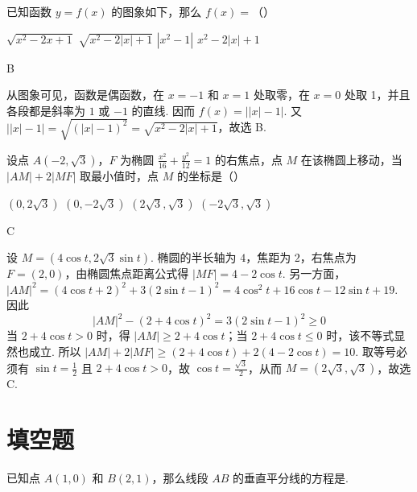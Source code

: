 \begin{problem}
已知函数 \(y = f(x)\) 的图象如下，那么 \(f(x) =\)（\quad）


\choices
    {\(\sqrt{x^2 - 2x + 1}\)}
    {\(\sqrt{x^2 - 2|x| + 1}\)}
    {\(|x^2 - 1|\)}
    {\(x^2 - 2|x| + 1\)}
\end{problem}

\begin{answer}
B
\end{answer}

\begin{solution}
从图象可见，函数是偶函数，在 \(x=-1\) 和 \(x=1\) 处取零，在 \(x=0\) 处取 1，并且各段都是斜率为 \(1\) 或 \(-1\) 的直线. 因而 \(f(x)=\bigl||x|-1\bigr|\). 又 \(\bigl||x|-1\bigr|=\sqrt{(|x|-1)^2}=\sqrt{x^2-2|x|+1}\)，故选 B.
\end{solution}

\begin{problem}
设点 \(A(-2,\sqrt{3})\)，\(F\) 为椭圆 \(\frac{x^2}{16} + \frac{y^2}{12} = 1\) 的右焦点，点 \(M\) 在该椭圆上移动，当 \(|AM| + 2|MF|\) 取最小值时，点 \(M\) 的坐标是（\quad）

\choices
    {\((0,2\sqrt{3})\)}
    {\((0,-2\sqrt{3})\)}
    {\((2\sqrt{3},\sqrt{3})\)}
    {\((-2\sqrt{3},\sqrt{3})\)}
\end{problem}

\begin{answer}
C
\end{answer}

\begin{solution}
设 \(M=(4\cos t,2\sqrt3\sin t)\). 椭圆的半长轴为 \(4\)，焦距为 \(2\)，右焦点为 \(F=(2,0)\)，由椭圆焦点距离公式得 \(|MF|=4-2\cos t\). 另一方面，\(|AM|^2=(4\cos t+2)^2+3(2\sin t-1)^2=4\cos^2t+16\cos t-12\sin t+19\). 因此
\[
|AM|^2-(2+4\cos t)^2=3(2\sin t-1)^2\geqslant0
\]
当 \(2+4\cos t>0\) 时，得 \(|AM|\geqslant2+4\cos t\)；当 \(2+4\cos t\leqslant0\) 时，该不等式显然也成立. 所以 \(|AM|+2|MF|\geqslant(2+4\cos t)+2(4-2\cos t)=10\). 取等号必须有 \(\sin t=\frac12\) 且 \(2+4\cos t>0\)，故 \(\cos t=\frac{\sqrt3}{2}\)，从而 \(M=(2\sqrt3,\sqrt3)\)，故选 C.
\end{solution}

\section{填空题}

\begin{problem}
已知点 \(A(1,0)\) 和 \(B(2,1)\)，那么线段 \(AB\) 的垂直平分线的方程是\fillinblank{}.
\end{problem}

